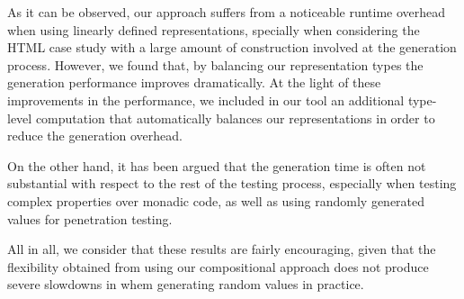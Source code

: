 As it can be observed, our approach suffers from a noticeable runtime overhead
when using linearly defined representations, specially when considering the HTML
case study with a large amount of construction involved at the generation
process.
%
However, we found that, by balancing our representation types the generation
performance improves dramatically.
%
At the light of these improvements in the performance, we included in our tool
an additional type-level computation that automatically balances our
representations in order to reduce the generation overhead.


On the other hand, it has been argued that the generation time is often not
substantial with respect to the rest of the testing process, especially when
testing complex properties over monadic code, as well as using randomly
generated values for penetration testing.


All in all, we consider that these results are fairly encouraging, given that
the flexibility obtained from using our compositional approach does not produce
severe slowdowns in whem generating random values in practice.

